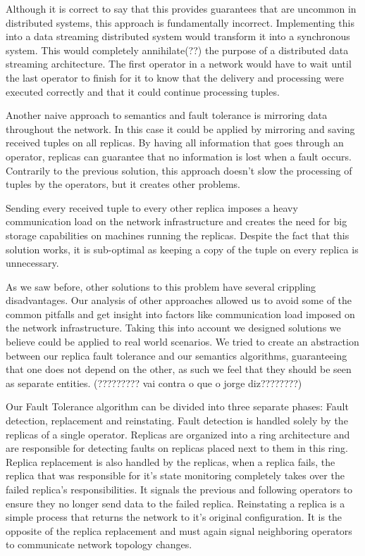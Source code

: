 \documentclass[times, 10pt,twocolumn]{article}
\begin{document}
	Although it is correct to say that this provides guarantees that are uncommon
in distributed systems, this approach is fundamentally incorrect. Implementing
this into a data streaming distributed system would transform it into a 
synchronous system. This would completely annihilate(??) the purpose of a distributed
data streaming architecture. The first operator in a network would have to
wait until the last operator to finish for it to know that the delivery and processing 
were executed correctly and that it could continue processing tuples. 


	 Another naive approach to semantics and fault tolerance is mirroring data  
throughout the network. In this case it could be applied by mirroring and saving 
received tuples on all replicas. By having all information that goes through an
operator, replicas can guarantee that no information is lost when a fault occurs.
Contrarily to the previous solution, this approach doesn't slow the processing 
of tuples by the operators, but it creates other problems. 

	Sending every received tuple to every other replica imposes a heavy communication
load on the network infrastructure and creates the need for big storage 
capabilities on machines running the replicas. Despite the fact that this solution
works, it is sub-optimal as keeping a copy of the tuple on every replica is unnecessary.
	

	As we saw before, other solutions to this problem have several crippling 
disadvantages. Our analysis of other approaches allowed us to avoid some of the 
common pitfalls and get insight into factors like communication load imposed on 
the network infrastructure. Taking this into account we designed solutions we believe 
could be applied to real world scenarios. We tried to create an abstraction between 
our replica fault tolerance and our semantics algorithms, guaranteeing that one does 
not depend on the other, as such we feel that they should be seen as separate 
entities.  (????????? vai contra o que o jorge diz????????)

	Our Fault Tolerance algorithm can be divided into three separate phases: Fault
detection, replacement and reinstating. Fault detection is handled solely by 
the replicas of a single operator. Replicas are organized into a ring architecture
and are responsible for detecting faults on replicas placed next to them in this
ring. Replica replacement is also handled by the replicas, when a replica fails, 
the replica that was responsible for it's state monitoring completely takes 
over the failed replica's responsibilities. It signals the previous and following 
operators to ensure they no longer send data to the failed replica. 
Reinstating a replica is a simple process that returns the network to it's original 
configuration. It is the opposite of the replica replacement and must again signal
neighboring operators to communicate network topology changes.
\end{document}
